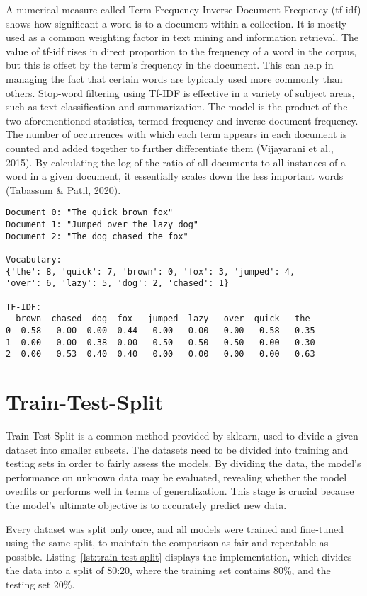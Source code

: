 A numerical measure called Term Frequency-Inverse Document Frequency (tf-idf) shows how significant a word is to a document within a collection. It is mostly used as a common weighting factor in text mining and information retrieval. The value of tf-idf rises in direct proportion to the frequency of a word in the corpus, but this is offset by the term's frequency in the document. This can help in managing the fact that certain words are typically used more commonly than others. Stop-word filtering using Tf-IDF is effective in a variety of subject areas, such as text classification and summarization. The model is the product of the two aforementioned statistics, termed frequency and inverse document frequency. The number of occurrences with which each term appears in each document is counted and added together to further differentiate them (Vijayarani et al., 2015). By calculating the log of the ratio of all documents to all instances of a word in a given document, it essentially scales down the less important words (Tabassum \& Patil, 2020).

\begin{verbatim}
Document 0: "The quick brown fox"
Document 1: "Jumped over the lazy dog"
Document 2: "The dog chased the fox"

Vocabulary: 
{'the': 8, 'quick': 7, 'brown': 0, 'fox': 3, 'jumped': 4,
'over': 6, 'lazy': 5, 'dog': 2, 'chased': 1}

TF-IDF:
  brown  chased  dog  fox   jumped  lazy   over  quick   the 
0  0.58   0.00  0.00  0.44   0.00   0.00   0.00   0.58   0.35  
1  0.00   0.00  0.38  0.00   0.50   0.50   0.50   0.00   0.30  
2  0.00   0.53  0.40  0.40   0.00   0.00   0.00   0.00   0.63   
\end{verbatim}

\section{Train-Test-Split}

Train-Test-Split is a common method provided by sklearn, used to divide a given dataset into smaller subsets. The datasets need to be divided into training and testing sets in order to fairly assess the models. By dividing the data, the model's performance on unknown data may be evaluated, revealing whether the model overfits or performs well in terms of generalization. This stage is crucial because the model's ultimate objective is to accurately predict new data.

Every dataset was split only once, and all models were trained and fine-tuned using the same split, to maintain the comparison as fair and repeatable as possible. Listing~\ref{lst:train-test-split} displays the implementation, which divides the data into a split of 80:20, where the training set contains 80\%, and the testing set 20\%. 

